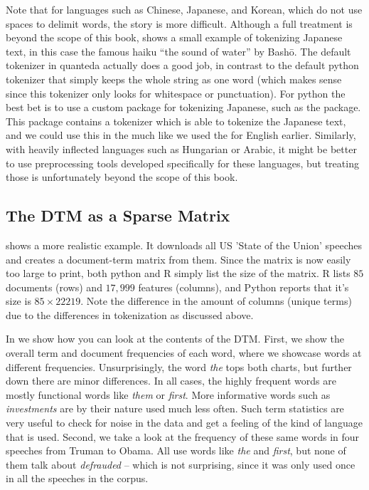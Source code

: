 Note that for languages such as Chinese, Japanese, and Korean, which do not use spaces to delimit words, the story is more difficult.
Although a full treatment is beyond the scope of this book,  shows a small example of tokenizing Japanese text,
in this case the famous haiku ``the sound of water'' by Bash\={o}.
The default tokenizer in quanteda actually does a good job, in contrast to the default python tokenizer
that simply keeps the whole string as one word
(which makes sense since this tokenizer only looks for whitespace or punctuation).
For python the best bet is to use a custom package for tokenizing Japanese, such as the  package.
This package contains a tokenizer which is able to tokenize the Japanese text, and we could use this in the 
much like we used the  for English earlier.
Similarly, with heavily inflected languages such as Hungarian or Arabic,
it might be better to use preprocessing tools developed specifically for these languages, but treating those is unfortunately
beyond the scope of this book. 


\subsection{The DTM as a Sparse Matrix}


 shows a more realistic example.
It downloads all US 'State of the Union' speeches and creates a document-term matrix from them.
Since the matrix is now easily too large to print, both python and R simply list the size of the matrix.
R lists $85$ documents (rows) and $17,999$ features (columns), and Python reports that it's size is $85\times22219$.
Note the difference in the amount of columns (unique terms) due to the differences in tokenization as discussed above. 


In  we show how you can look at the contents of the DTM. First, we show the overall term and document frequencies of each word, where we showcase words at different frequencies. Unsurprisingly, the word \emph{the} tops both charts, but further down there are minor differences.
In all cases, the highly frequent words are mostly functional words like \emph{them} or \emph{first}. More informative words such as \emph{investments} are by their nature used much less often.
Such term statistics are very useful to check for noise in the data and get a feeling of the kind of language that is used. 
Second, we take a look at the frequency of these same words in four speeches from Truman to Obama. All use words like \emph{the} and \emph{first}, but none of them talk about \emph{defrauded} -- which is not surprising, since it was only used once in all the speeches in the corpus.

